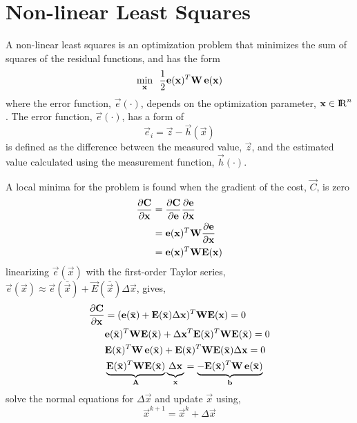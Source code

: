 \section{Non-linear Least Squares}

A non-linear least squares is an optimization problem that minimizes the sum of
squares of the residual functions, and has the form
%
\begin{equation}
  \min_{{\mathbf{x}}} \enspace
    \dfrac{1}{2}
    {\mathbf{e}}({\mathbf{x}})^{T}
    {\mathbf{W}} \,
    {\mathbf{e}}({\mathbf{x}})
\end{equation}
%
where the error function, $\Vec{e}(\cdot)$, depends on the optimization
parameter, ${\mathbf{x}} \in {\rm I\!R}^{n}$. The error function, $\Vec{e}(\cdot)$, has a
form of
%
\begin{equation}
  \Vec{e}_{i} =
    \Vec{z} - \Vec{h}(\Vec{x})
\end{equation}
%
is defined as the difference between the measured value, $\Vec{z}$, and the
estimated value calculated using the measurement function, $\Vec{h}(\cdot)$.

A local minima for the problem is found when the gradient of the cost,
$\Vec{C}$, is zero
%
\begin{align}
  \dfrac{\partial{{\mathbf{C}}}}{\partial{{\mathbf{x}}}}
  &=
    \dfrac{\partial{{\mathbf{C}}}}{\partial{{\mathbf{e}}}}
    \dfrac{\partial{{\mathbf{e}}}}{\partial{{\mathbf{x}}}} \\
  &=
    {\mathbf{e}}({\mathbf{x}})^{T}
    {\mathbf{W}}
    \dfrac{\partial{{\mathbf{e}}}}{\partial{{\mathbf{x}}}} \\
  &=
    {\mathbf{e}}({\mathbf{x}})^{T}
    {\mathbf{W}}
    {\mathbf{E}}({\mathbf{x}})
\end{align}
%
linearizing $\Vec{e}(\Vec{x})$ with the first-order Taylor series,
$\Vec{e}(\Vec{x}) \approx \Vec{e}(\bar{\Vec{x}}) + \Vec{E}(\bar{\Vec{x}})
\Delta\Vec{x}$, gives,
%
\begin{align}
  \dfrac{\partial{\Vec{C}}}{\partial{\Vec{x}}}
  &=
    (\Vec{e}(\bar{\Vec{x}}) + \Vec{E}(\bar{\Vec{x}})\Delta\Vec{x})^{\transpose}
    \Mat{W} \Vec{E}(\Vec{x})
  = 0 \\
  &\Vec{e}(\bar{\Vec{x}})^{\transpose} \Mat{W} \Vec{E}(\bar{\Vec{x}})
    + \Delta\Vec{x}^{\transpose} \Vec{E}(\bar{\Vec{x}})^{\transpose}
      \Mat{W}
      \Vec{E}(\bar{\Vec{x}})
    = 0 \\
  &\Vec{E}(\bar{\Vec{x}})^{\transpose} \Mat{W} \, \Vec{e}(\bar{\Vec{x}})
    + \Vec{E}(\bar{\Vec{x}})^{\transpose}
      \Mat{W}
      \Vec{E}(\bar{\Vec{x}})
      \Delta\Vec{x}
    = 0 \\
  &\underbrace{
      \Vec{E}(\bar{\Vec{x}})^{\transpose}
      \Mat{W}
      \Vec{E}(\bar{\Vec{x}})
  }_{\Mat{A}}
  \underbrace{
    \vphantom{
      \Vec{E}(\bar{\Vec{x}})^{\transpose}
      \Mat{W}
      \Vec{E}(\bar{\Vec{x}})
    }
    \Delta\Vec{x}
  }_{\Vec{x}}
  =
  \underbrace{
    - \Vec{E}(\bar{\Vec{x}})^{\transpose}
    \Mat{W} \,
    \Vec{e}(\bar{\Vec{x}})
  }_{\Vec{b}}
\end{align}
%
solve the normal equations for $\Delta\Vec{x}$ and update $\Vec{x}$ using,
%
\begin{equation}
  \Vec{x}^{k+1} = \Vec{x}^{k} + \Delta{\Vec{x}}
\end{equation}



